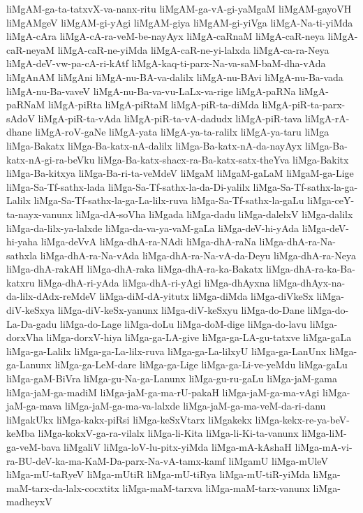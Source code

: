 {liMgAM-ga-ta-tatxvX-va-nanx-ritu
liMgAM-ga-vA-gi-yaMgaM
liMgAM-gayoVH
liMgAMgeV
liMgAM-gi-yAgi
liMgAM-giya
liMgAM-gi-yiVga
liMgA-Na-ti-yiMda
liMgA-cAra
liMgA-cA-ra-veM-be-nayAyx
liMgA-caRnaM
liMgA-caR-neya
liMgA-caR-neyaM
liMgA-caR-ne-yiMda
liMgA-caR-ne-yi-lalxda
liMgA-ca-ra-Neya
liMgA-deV-vw-pa-cA-ri-kAtf
liMgA-kaq-ti-parx-Na-va-saM-baM-dha-vAda
liMgAnAM
liMgAni
liMgA-nu-BA-va-dalilx
liMgA-nu-BAvi
liMgA-nu-Ba-vada
liMgA-nu-Ba-vaveV
liMgA-nu-Ba-va-vu-LaLx-va-rige
liMgA-paRNa
liMgA-paRNaM
liMgA-piRta
liMgA-piRtaM
liMgA-piR-ta-diMda
liMgA-piR-ta-parx-sAdoV
liMgA-piR-ta-vAda
liMgA-piR-ta-vA-dadudx
liMgA-piR-tava
liMgA-rA-dhane
liMgA-roV-gaNe
liMgA-yata
liMgA-ya-ta-ralilx
liMgA-ya-taru
liMga
liMga-Bakatx
liMga-Ba-katx-nA-dalilx
liMga-Ba-katx-nA-da-nayAyx
liMga-Ba-katx-nA-gi-ra-beVku
liMga-Ba-katx-shacx-ra-Ba-katx-satx-theYva
liMga-Bakitx
liMga-Ba-kitxya
liMga-Ba-ri-ta-veMdeV
liMgaM
liMgaM-gaLaM
liMgaM-ga-Lige
liMga-Sa-Tf-sathx-lada
liMga-Sa-Tf-sathx-la-da-Di-yalilx
liMga-Sa-Tf-sathx-la-ga-Lalilx
liMga-Sa-Tf-sathx-la-ga-La-lilx-ruva
liMga-Sa-Tf-sathx-la-gaLu
liMga-ceY-ta-nayx-vanunx
liMga-dA-soVha
liMgada
liMga-dadu
liMga-dalelxV
liMga-dalilx
liMga-da-lilx-ya-lalxde
liMga-da-va-ya-vaM-gaLa
liMga-deV-hi-yAda
liMga-deV-hi-yaha
liMga-deVvA
liMga-dhA-ra-NAdi
liMga-dhA-raNa
liMga-dhA-ra-Na-sathxla
liMga-dhA-ra-Na-vAda
liMga-dhA-ra-Na-vA-da-Deyu
liMga-dhA-ra-Neya
liMga-dhA-rakAH
liMga-dhA-raka
liMga-dhA-ra-ka-Bakatx
liMga-dhA-ra-ka-Ba-katxru
liMga-dhA-ri-yAda
liMga-dhA-ri-yAgi
liMga-dhAyxna
liMga-dhAyx-na-da-lilx-dAdx-reMdeV
liMga-diM-dA-yitutx
liMga-diMda
liMga-diVkeSx
liMga-diV-keSxya
liMga-diV-keSx-yanunx
liMga-diV-keSxyu
liMga-do-Dane
liMga-do-La-Da-gadu
liMga-do-Lage
liMga-doLu
liMga-doM-dige
liMga-do-lavu
liMga-dorxVha
liMga-dorxV-hiya
liMga-ga-LA-give
liMga-ga-LA-gu-tatxve
liMga-gaLa
liMga-ga-Lalilx
liMga-ga-La-lilx-ruva
liMga-ga-La-lilxyU
liMga-ga-LanUnx
liMga-ga-Lanunx
liMga-ga-LeM-dare
liMga-ga-Lige
liMga-ga-Li-ve-yeMdu
liMga-gaLu
liMga-gaM-BiVra
liMga-gu-Na-ga-Lanunx
liMga-gu-ru-gaLu
liMga-jaM-gama
liMga-jaM-ga-madiM
liMga-jaM-ga-ma-rU-pakaH
liMga-jaM-ga-ma-vAgi
liMga-jaM-ga-mava
liMga-jaM-ga-ma-va-lalxde
liMga-jaM-ga-ma-veM-da-ri-danu
liMgakUkx
liMga-kakx-piRsi
liMga-keSxVtarx
liMgakekx
liMga-kekx-re-ya-beV-keMba
liMga-kokxV-ga-ra-vilalx
liMga-li-Kita
liMga-li-Ki-ta-vanunx
liMga-liM-ga-veM-bava
liMgaliV
liMga-loV-lu-pitx-yiMda
liMga-mA-kAshaH
liMga-mA-vi-ra-BU-deV-ka-ma-KaM-Da-parx-Na-vA-tamx-kamf
liMgamU
liMga-mUleV
liMga-mU-taRyeV
liMga-mUtiR
liMga-mU-tiRya
liMga-mU-tiR-yiMda
liMga-maM-tarx-da-lalx-cocxtitx
liMga-maM-tarxva
liMga-maM-tarx-vanunx
liMga-madheyxV
}
